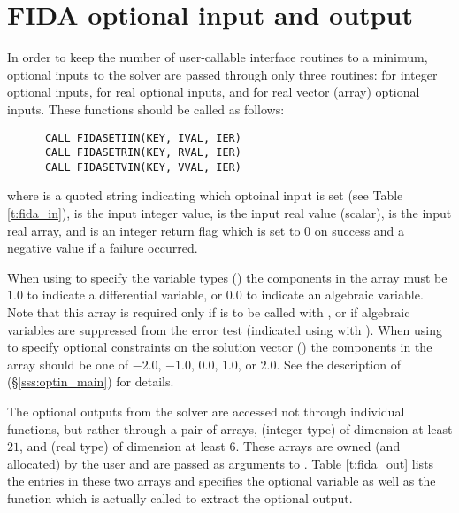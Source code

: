 \section{FIDA optional input and output}

In order to keep the number of user-callable {\fida} interface routines to
a minimum, optional inputs to the {\ida} solver are passed through only
three routines:  for integer optional inputs, 
for real optional inputs, and  for real vector (array) optional
inputs.  These functions should be called as follows:
\begin{verbatim}
      CALL FIDASETIIN(KEY, IVAL, IER)
      CALL FIDASETRIN(KEY, RVAL, IER)
      CALL FIDASETVIN(KEY, VVAL, IER)
\end{verbatim}
where  is a quoted string indicating which optoinal input is set
(see Table \ref{t:fida_in}),  is the input integer value,
 is the input real value (scalar),
 is the input real array, and
 is an integer return flag which is set to $0$ on success and
a negative value if a failure occurred.

When using  to specify the variable types ()
the components in the array  must be $1.0$ to indicate a differential 
variable, or $0.0$ to indicate an algebraic variable.
Note that this array is required only if  is to be called
with , or if algebraic variables are suppressed from the error
test (indicated using  with ).
%
When using  to specify optional constraints on the
solution vector () the components in the
array  should be one of $-2.0$, $-1.0$, $0.0$, $1.0$, or $2.0$.
See the description of  (\S\ref{sss:optin_main})
for details.

The optional outputs from the {\ida} solver are accessed not through
individual functions, but rather through a pair of arrays, 
(integer type) of dimension at least $21$, and  (real type) of
dimension at least $6$.  These arrays are owned (and allocated) by
the user and are passed as arguments to .  Table
\ref{t:fida_out} lists the entries in these two arrays and specifies
the optional variable as well as the {\ida} function which is actually
called to extract the optional output.

